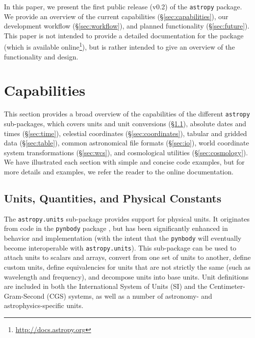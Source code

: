 \documentclass[traditabstract]{aa}
\newcommand{\astropy}{\texttt{astropy}\xspace}
\begin{document}
In this paper, we present the first public release (v0.2) of the \astropy
package. We provide an overview of the current capabilities
(\S\ref{sec:capabilities}), our development workflow (\S\ref{sec:workflow}),
and planned functionality (\S\ref{sec:future}). This paper is not intended to
provide a detailed documentation for the package (which is available
online\footnote{\url{http://docs.astropy.org}}), but is rather intended to give
an overview of the functionality and design.

\section{Capabilities}

This section provides a broad overview of the capabilities of the different
\astropy sub-packages, which covers units and unit conversions
(\S\ref{sec:units_main}), absolute dates and times (\S\ref{sec:time}),
celestial coordinates (\S\ref{sec:coordinates}), tabular and gridded data
(\S\ref{sec:table}), common astronomical file formats (\S\ref{sec:io}), world
coordinate system transformations (\S\ref{sec:wcs}), and cosmological utilities
(\S\ref{sec:cosmology}). We have illustrated each section with simple and
concise code examples, but for more details and examples, we refer the reader
to the online documentation.\footnotemark[3]

\label{sec:capabilities}

\subsection{Units, Quantities, and Physical Constants}

\label{sec:units_main}

The \texttt{astropy.units} sub-package provides support for physical units. It
originates from code in the \texttt{pynbody} package \citep{pynbody}, but has been
significantly enhanced in behavior and implementation (with the intent that the \texttt{pynbody} will eventually become interoperable with \texttt{astropy.units}). This sub-package can be
used to attach units to scalars and arrays, convert from one set of units to
another, define custom units, define equivalencies for units that are not
strictly the same (such as wavelength and frequency), and decompose units into
base units. Unit definitions are included in both the International System of
Units (SI) and the Centimeter-Gram-Second (CGS) systems, as well as a number of
astronomy- and astrophysics-specific units.
\end{document}
